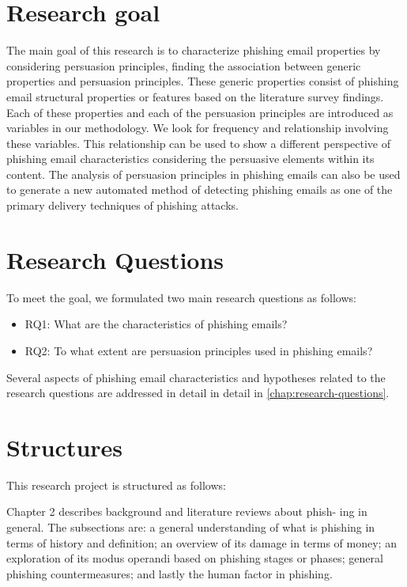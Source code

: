 \section{Research goal}

The main goal of this research is to characterize phishing email properties
by considering persuasion principles, finding the association between
generic properties and persuasion principles. These generic properties
consist of phishing email structural properties or features based
on the literature survey findings. Each of these properties and each
of the persuasion principles are introduced as variables in our methodology.
We look for frequency and relationship involving these variables.
This relationship can be used to show a different perspective of phishing
email characteristics considering the persuasive elements within its
content. The analysis of persuasion principles in phishing emails
can also be used to generate a new automated method of detecting phishing
emails as one of the primary delivery techniques of phishing attacks.


\section{Research Questions}

To meet the goal, we formulated two main research questions as follows:
\begin{itemize}
\item RQ1: What are the characteristics of phishing emails?
\item RQ2: To what extent are persuasion principles used in phishing emails?
\end{itemize}
%
Several aspects of phishing email characteristics and hypotheses related
to the research questions are addressed in detail in detail in \autoref{chap:research-questions}.

%

\section{Structures}

This research project is structured as follows: 

Chapter 2 describes background and literature reviews about phish-
ing in general. The subsections are: a general understanding of what
is phishing in terms of history and definition; an overview of its
damage in terms of money; an exploration of its modus operandi based
on phishing stages or phases; general phishing countermeasures; and
lastly the human factor in phishing.

